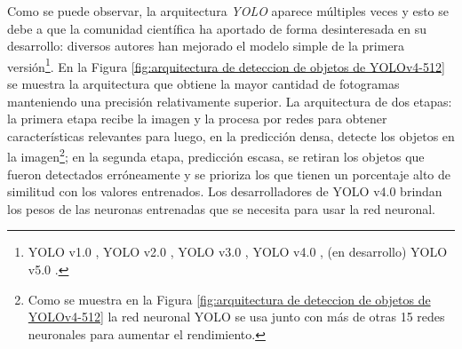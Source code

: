 

Como se puede observar, la arquitectura \textit{YOLO} aparece múltiples veces y esto se debe a que la comunidad científica ha aportado de forma desinteresada en su desarrollo: diversos autores han mejorado el modelo simple de la primera versión\footnote{YOLO v1.0 \cite{Redmon2016}, YOLO v2.0 \cite{Redmon2017}, YOLO v3.0 \cite{Redmon2018}, YOLO v4.0 \cite{Solawetz2020}, (en desarrollo) YOLO v5.0 \cite{bochkovskiy2020yolov4}.}. En la Figura \ref{fig:arquitectura de deteccion de objetos de YOLOv4-512} se muestra la arquitectura que obtiene la mayor cantidad de fotogramas manteniendo una precisión relativamente superior. La arquitectura de dos etapas: la primera etapa recibe la imagen y la procesa por redes para obtener características relevantes para luego, en la predicción densa, detecte los objetos en la imagen\footnote{Como se muestra en la Figura \ref{fig:arquitectura de deteccion de objetos de YOLOv4-512} la red neuronal YOLO se usa junto con más de otras 15 redes neuronales para aumentar el rendimiento.}; en la segunda etapa, predicción escasa, se retiran los objetos que fueron detectados erróneamente y se prioriza los que tienen un porcentaje alto de similitud con los valores entrenados. Los desarrolladores de YOLO v4.0 brindan los pesos de las neuronas entrenadas que se necesita para usar la red neuronal.

